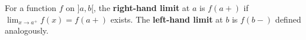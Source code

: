 For a function $f$ on $]a, b[$, the \textbf{right-hand limit} at $a$ is $f(a+)$ if $\lim_{x \to a^+} f(x) = f(a+)$ exists. The \textbf{left-hand limit} at $b$ is $f(b-)$ defined analogously.
